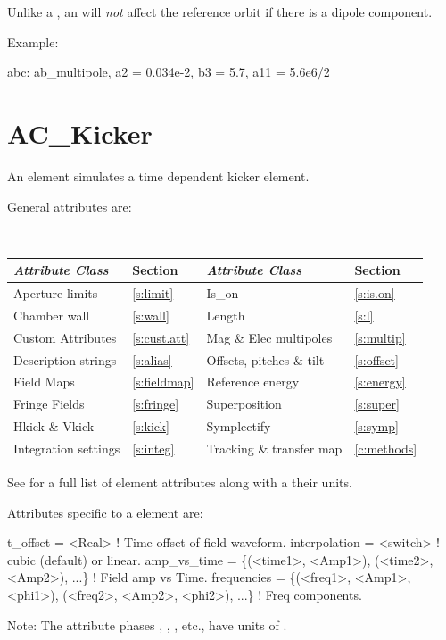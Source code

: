 Unlike a , an  will {\em not} affect the reference orbit if there is
a dipole component.

Example:
\begin{example}
  abc: ab_multipole, a2 = 0.034e-2, b3 = 5.7, a11 = 5.6e6/2
\end{example}

\newpage

\section{AC_Kicker}
\label{s:ac.kick}

An  element simulates a time dependent kicker element.

General  attributes are:
\begin{center}
\tt
\begin{tabular}{llll} \toprule
  {\sl Attribute Class}      & Section           & {\sl Attribute Class}      & Section         \\ \midrule
  Aperture limits            & \ref{s:limit}     & Is_on                      & \ref{s:is.on}   \\
  Chamber wall               & \ref{s:wall}      & Length                     & \ref{s:l}       \\
  Custom Attributes          & \ref{s:cust.att}  & Mag \& Elec multipoles     & \ref{s:multip}  \\
  Description strings        & \ref{s:alias}     & Offsets, pitches \& tilt   & \ref{s:offset}  \\
  Field Maps                 & \ref{s:fieldmap}  & Reference energy           & \ref{s:energy}  \\ 
  Fringe Fields              & \ref{s:fringe}    & Superposition              & \ref{s:super}   \\
  Hkick \& Vkick             & \ref{s:kick}      & Symplectify                & \ref{s:symp}    \\
  Integration settings       & \ref{s:integ}     & Tracking \& transfer map   & \ref{c:methods} \\
  \bottomrule
\end{tabular}
\end{center}
\toffset
See  for a full list of element attributes along with a their units.

Attributes specific to a  element are:
\begin{example}
  t_offset        = <Real>              ! Time offset of field waveform.
  interpolation   = <switch>            ! cubic (default) or linear.
  amp_vs_time = \{(<time1>, <Amp1>), (<time2>, <Amp2>), ...\}  ! Field amp vs Time.
  frequencies = \{(<freq1>, <Amp1>, <phi1>), 
                              (<freq2>, <Amp2>, <phi2>), ...\} ! Freq components.
\end{example}
Note: The  attribute phases , , , etc., have units of
.

